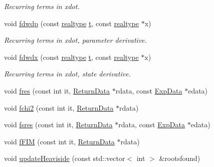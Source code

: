 \begin{DoxyCompactItemize}
\begin{DoxyCompactList}\small\item\em Recurring terms in xdot. \end{DoxyCompactList}\item 
void \mbox{\hyperlink{classamici_1_1_model_a7a8903313cd31dad4fa580c0e434bb1c}{fdwdp}} (const \mbox{\hyperlink{namespaceamici_a1bdce28051d6a53868f7ccbf5f2c14a3}{realtype}} \mbox{\hyperlink{classamici_1_1_model_a711281d57e9710226face29151cc4641}{t}}, const \mbox{\hyperlink{namespaceamici_a1bdce28051d6a53868f7ccbf5f2c14a3}{realtype}} $\ast$x)
\begin{DoxyCompactList}\small\item\em Recurring terms in xdot, parameter derivative. \end{DoxyCompactList}\item 
void \mbox{\hyperlink{classamici_1_1_model_a29b16aa0c3fb0254fb248c003473d5f9}{fdwdx}} (const \mbox{\hyperlink{namespaceamici_a1bdce28051d6a53868f7ccbf5f2c14a3}{realtype}} \mbox{\hyperlink{classamici_1_1_model_a711281d57e9710226face29151cc4641}{t}}, const \mbox{\hyperlink{namespaceamici_a1bdce28051d6a53868f7ccbf5f2c14a3}{realtype}} $\ast$x)
\begin{DoxyCompactList}\small\item\em Recurring terms in xdot, state derivative. \end{DoxyCompactList}\item 
void \mbox{\hyperlink{classamici_1_1_model_a991a9aab9f325625a35179fa601fa426}{fres}} (const int it, \mbox{\hyperlink{classamici_1_1_return_data}{Return\+Data}} $\ast$rdata, const \mbox{\hyperlink{classamici_1_1_exp_data}{Exp\+Data}} $\ast$edata)
\item 
void \mbox{\hyperlink{classamici_1_1_model_aaf1dc93d4591b179951824fc3b750646}{fchi2}} (const int it, \mbox{\hyperlink{classamici_1_1_return_data}{Return\+Data}} $\ast$rdata)
\item 
void \mbox{\hyperlink{classamici_1_1_model_a2a774934ab3b0a22a706f6328dd95597}{fsres}} (const int it, \mbox{\hyperlink{classamici_1_1_return_data}{Return\+Data}} $\ast$rdata, const \mbox{\hyperlink{classamici_1_1_exp_data}{Exp\+Data}} $\ast$edata)
\item 
void \mbox{\hyperlink{classamici_1_1_model_aba7a1237e503813d9ec7ca56413f1e1d}{f\+F\+IM}} (const int it, \mbox{\hyperlink{classamici_1_1_return_data}{Return\+Data}} $\ast$rdata)
\item 
void \mbox{\hyperlink{classamici_1_1_model_ae053072690046bd24225447de93a9e84}{update\+Heaviside}} (const std\+::vector$<$ int $>$ \&rootsfound)

\end{DoxyCompactItemize}
